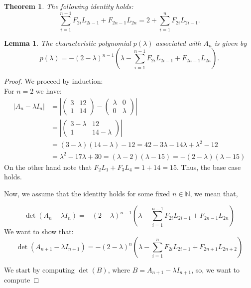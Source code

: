 \documentclass[10pt,a4paper]{amsart}
\newtheorem{thm}{Theorem}
\newtheorem{lem}{Lemma}
\begin{document}
\begin{thm}\label{aux2}
The following identity holds:
\[
\sum_{i=1}^{n-1}F_{2i}L_{2i-1}+F_{2n-1}L_{2n}
=
2+\sum_{i=1}^{n}F_{2i}L_{2i-1}.
\]
\end{thm}

\begin{lem}\label{charp}
The characteristic polynomial $p(\lambda)$ associated with $A_n$ is given by
\[
p(\lambda)=-(2-\lambda)^{n-1}\left(\lambda-\displaystyle\sum_{i=1}^{n-1}F_{2i}L_{2i-1}+F_{2n-1}L_{2n}\right).
\]
\end{lem}

\begin{proof} We proceed by induction: \\
For $n=2$ we have: 
\begin{align*}
\left|A_n-\lambda I_n\right|&=\left|\left(\begin{array}{ll}
3 & 12 \\
1 & 14
\end{array}\right)-\left(\begin{array}{ll}
\lambda & 0 \\
0 & \lambda
\end{array}\right)\right| \\
&=\left|\left(\begin{array}{cc}
3-\lambda & 12 \\
1 & 14-\lambda
\end{array}\right)\right|\\
& =(3-\lambda)(14-\lambda)-12 =42-3 \lambda-14 \lambda+\lambda^2-12 \\
& =\lambda^2-17 \lambda+30  =(\lambda-2)(\lambda-15) =-(2-\lambda)(\lambda-15)
\end{align*}
On the other hand note that $F_{2}L_{1}+F_{3}L_{4}=1+14=15$. Thus, the base case holds.    

\noindent Now, we assume that the identity holds for some fixed $n\in \mathbb{N}$, we mean that, 

$$
\operatorname{det}\left(A_n-\lambda I_n\right) =-(2-\lambda)^{n-1}\left(\lambda-\sum_{i=1}^{n-1}F_{2 i}L_{2i-1}+F_{2n-1}L_{2 n}\right)
$$
\noindent We want to show that: 
$$
\operatorname{det}\left(A_{n+1}-\lambda I_{n+1}\right)=-(2-\lambda)^n\left(\lambda-\sum_{i=1}^nF_{2i} L_{2 i-1}+F_{2 n+1} L_{2n+2}\right)
$$

\noindent We start by computing $\operatorname{det}\left(B\right)$, where $B=A_{n+1}-\lambda I_{n+1}$, so, we want to compute  


\end{proof}
\end{document}
